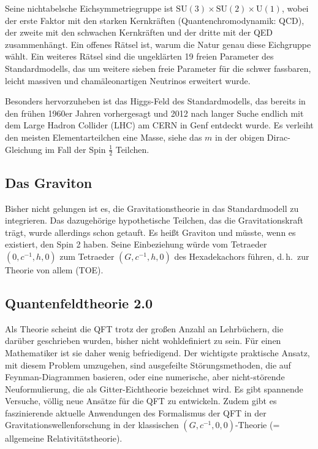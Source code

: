 \documentclass{scrartcl}
\begin{document}
Seine nichtabelsche Eichsymmetriegruppe ist $\mathrm{SU}(3) \times \mathrm{SU}(2) \times \mathrm{U}(1)$, wobei der erste Faktor mit den starken Kernkräften (Quantenchromodynamik: QCD), der zweite mit den schwachen Kernkräften und der dritte mit der QED zusammenhängt. Ein offenes Rätsel ist, warum die Natur genau diese Eichgruppe wählt. Ein weiteres Rätsel sind die ungeklärten 19 freien Parameter des Standardmodells, das um weitere sieben freie Parameter für die schwer fassbaren, leicht massiven und chamäleonartigen Neutrinos erweitert wurde.

Besonders hervorzuheben ist das Higgs-Feld des Standardmodells, das bereits in den frühen 1960er Jahren vorhergesagt und 2012 nach langer Suche endlich mit dem Large Hadron Collider (LHC) am CERN in Genf entdeckt wurde. Es verleiht den meisten Elementarteilchen eine Masse, siehe das $m$ in der obigen Dirac-Gleichung im Fall der Spin $\frac12$ Teilchen.


\subsection*{Das Graviton}

Bisher nicht gelungen ist es, die Gravitationstheorie in das Standardmodell zu integrieren. Das dazugehörige hypothetische Teilchen, das die Gravitationskraft trägt, wurde allerdings schon getauft. Es heißt Graviton und müsste, wenn es existiert, den Spin 2 haben. Seine Einbeziehung würde vom Tetraeder $(0, c^{-1},h,0)$ zum Tetraeder $(G,c^{-1},h,0)$ des Hexadekachors führen, d.\,h.\ zur Theorie von allem (TOE).


\subsection*{Quantenfeldtheorie 2.0}

Als Theorie scheint die QFT trotz der großen Anzahl an Lehrbüchern, die darüber geschrieben wurden, bisher nicht wohldefiniert zu sein. Für einen Mathematiker ist sie daher wenig befriedigend. Der wichtigste praktische Ansatz, mit diesem Problem umzugehen, sind ausgefeilte Störungsmethoden, die auf Feynman-Diagrammen basieren, oder eine numerische, aber nicht-störende Neuformulierung, die als Gitter-Eichtheorie bezeichnet wird. Es gibt spannende Versuche, völlig neue Ansätze für die QFT zu entwickeln. Zudem gibt es faszinierende aktuelle Anwendungen des Formalismus der QFT in der Gravitationswellenforschung in der klassischen $(G,c^{-1},0,0)$-Theorie (= allgemeine Relativitätstheorie).
\end{document}
